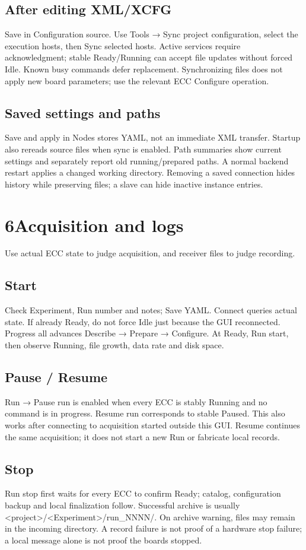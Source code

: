 \documentclass[11pt,a4paper]{article}
\newcommand{\pagehead}[2]{\pdfbookmark[1]{#1}{getdaq-guide-\thepage}\section*{#1}\textcolor{muted}{#2}\par\vspace{3pt}}
\begin{document}
\subsection*{After editing XML/XCFG}
Save in Configuration source. Use Tools → Sync project configuration, select the execution hosts, then Sync selected hosts. Active services require acknowledgment; stable Ready/Running can accept file updates without forced Idle. Known busy commands defer replacement. Synchronizing files does not apply new board parameters; use the relevant ECC Configure operation.

\subsection*{Saved settings and paths}
Save and apply in Nodes stores YAML, not an immediate XML transfer. Startup also rereads source files when sync is enabled. Path summaries show current settings and separately report old running/prepared paths. A normal backend restart applies a changed working directory. Removing a saved connection hides history while preserving files; a slave can hide inactive instance entries.


\newpage
\pagehead{6\quad Acquisition and logs}{Use actual ECC state to judge acquisition, and receiver files to judge recording.}
\subsection*{Start}
Check Experiment, Run number and notes; Save YAML. Connect queries actual state. If already Ready, do not force Idle just because the GUI reconnected. Progress all advances Describe → Prepare → Configure. At Ready, Run start, then observe Running, file growth, data rate and disk space.

\subsection*{Pause / Resume}
Run → Pause run is enabled when every ECC is stably Running and no command is in progress. Resume run corresponds to stable Paused. This also works after connecting to acquisition started outside this GUI. Resume continues the same acquisition; it does not start a new Run or fabricate local records.

\subsection*{Stop}
Run stop first waits for every ECC to confirm Ready; catalog, configuration backup and local finalization follow. Successful archive is usually <project>/<Experiment>/run\_NNNN/. On archive warning, files may remain in the incoming directory. A record failure is not proof of a hardware stop failure; a local message alone is not proof the boards stopped.
\end{document}
